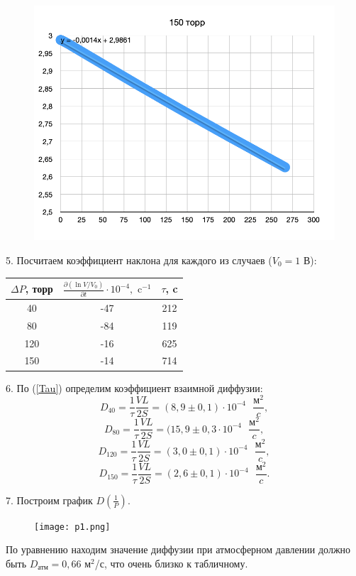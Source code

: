 \begin{figure}[h]
    \includegraphics*[width = 0.8\linewidth]{150.png}
\end{figure}

5. Посчитаем коэффициент наклона для каждого из случаев ($V_0 = 1$ В):
\begin{center}
\begin{tabular}[h]{|c|c|c|}
    \hline
    $\Delta P$, торр & $\frac{\partial (\ln V/V_0)}{\partial t} \cdot 10^{-4}, \text{ c}^{-1}$ & $\tau$, c \\
    \hline
    40 & -47 & 212 \\
    \hline
    80 & -84 & 119 \\
    \hline
    120 & -16 & 625 \\
    \hline
    150 & -14 & 714 \\
    \hline
\end{tabular}
\end{center}

6. По (\ref*{Tau}) определим коэффициент взаимной диффузии:
\[D_{40} = \frac 1\tau \frac{VL}{2S} = (8,9 \pm 0,1)\cdot 10^{-4}  \text{ }\frac{\text{м}^2}{c},\]
\[D_{80} = \frac 1\tau \frac{VL}{2S} = (15,9 \pm 0,3\cdot 10^{-4}  \text{ }\frac{\text{м}^2}{c},\]
\[D_{120} = \frac 1\tau \frac{VL}{2S} = (3,0 \pm 0,1)\cdot 10^{-4} \text{ }\frac{\text{м}^2}{c},\]
\[D_{150} = \frac 1\tau \frac{VL}{2S} = (2,6 \pm 0,1)\cdot 10^{-4} \text{ }\frac{\text{м}^2}{c}.\]

7. Построим график $D(\frac 1 P)$.
\begin{figure}[h]
    \centering
    \texttt{[image: p1.png]}
\end{figure}

По уравнению находим значение диффузии при атмосферном давлении должно быть $D_\text{атм} = 0,66$ м$^2$/с, что очень близко к табличному.
